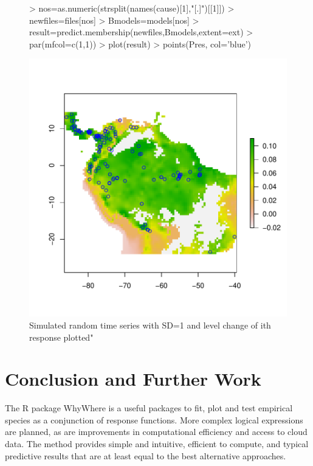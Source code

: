 \documentclass{article}
\begin{document}
\begin{figure}[htbp]
\begin{center}
\begin{Schunk}
\begin{Sinput}
> nos=as.numeric(strsplit(names(cause)[1],"[.]")[[1]])
> newfiles=files[nos]
> Bmodels=models[nos]
> result=predict.membership(newfiles,Bmodels,extent=ext)
> par(mfcol=c(1,1))
> plot(result)
> points(Pres, col='blue')
\end{Sinput}
\end{Schunk}
\includegraphics{article-006}
\caption{\label{fig:ts} Simulated random time series with SD=1 and level change of ith response plotted"}
\end{center}
\end{figure} 

\section{Conclusion and Further Work}

The R package WhyWhere is a useful packages to fit, plot and test empirical species as a conjunction of response functions.  More complex logical expressions are planned, as are improvements in computational efficiency and access to cloud data.  The method provides simple and intuitive, efficient to compute, and typical predictive results that are at least equal to the best alternative approaches.  





\end{document}
